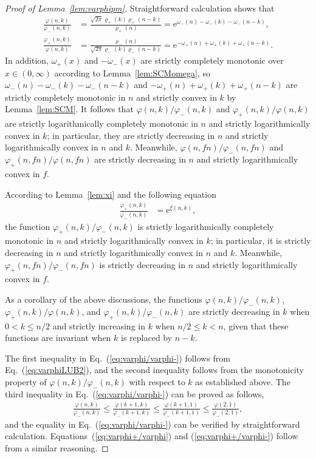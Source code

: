 \documentclass[aop]{imsart}
\theoremstyle{plain}
\theoremstyle{remark}
\newcommand{\rme}{\mathrm{e}}
\newcommand{\1}{\operatorname{\uppercase\expandafter{\romannumeral1}}}
\newcommand{\2}{\operatorname{\uppercase\expandafter{\romannumeral2}}}
\newcommand{\3}{\operatorname{\uppercase\expandafter{\romannumeral3}}}
\newcommand{\4}{\operatorname{\uppercase\expandafter{\romannumeral4}}}
\newcommand{\5}{\operatorname{\uppercase\expandafter{\romannumeral5}}}
\newcommand{\6}{\operatorname{\uppercase\expandafter{\romannumeral6}}}
\newcommand{\7}{\operatorname{\uppercase\expandafter{\romannumeral7}}}
\newcommand{\8}{\operatorname{\uppercase\expandafter{\romannumeral8}}}
\newcommand{\9}{\operatorname{\uppercase\expandafter{\romannumeral9}}}
\newcommand{\eref}[1]{Eq.~\textup{(\ref{#1})}}
\newcommand{\Eqsref}[2]{Equations~(\ref{#1}) and (\ref{#2})}
\newcommand{\lref}[1]{Lemma~\ref{#1}}
\begin{document}
\begin{proof}[Proof of \lref{lem:varphipm}]
Straightforward calculation shows that
	\begin{align}
	\frac{\varphi(n,k)}{\varphi_-(n,k)}&=\frac{\sqrt{2\pi}\varrho_+(k)\varrho_+(n-k)}{\varrho_+(n)}=\rme^{\omega_-(n)-\omega_-(k)-\omega_-(n-k)},\\
\frac{\varphi_+(n,k)}{\varphi(n,k)}&=\frac{\varrho_-(n)}{\sqrt{2\pi}\varrho_-(k)\varrho_-(n-k)}=\rme^{-\omega_+(n)+\omega_+(k)+\omega_+(n-k)}.
\end{align}
In addition, $\omega_+(x)$ and $-\omega_-(x)$ are strictly completely monotonic over $x\in (0,\infty)$ according to \lref{lem:SCMomega}, so $\omega_-(n)-\omega_-(k)-\omega_-(n-k)$ and $-\omega_+(n)+\omega_+(k)+\omega_+(n-k)$
are  strictly  completely monotonic in $n$ and strictly  convex in $k$ by  \lref{lem:SCM}. It follows that
 $\varphi(n,k)/\varphi_-(n,k)$ and
	$\varphi_+(n,k)/\varphi(n,k)$	are  strictly logarithmically completely monotonic in $n$ and strictly logarithmically convex in $k$; in particular, they are strictly decreasing in $n$ and strictly logarithmically convex in $n$ and $k$.  Meanwhile, $\varphi(n,fn)/\varphi_-(n,fn)$ and $\varphi_+(n,fn)/\varphi(n,fn)$
	are strictly decreasing in $n$ and strictly  logarithmically convex in  $f$.

 According to \lref{lem:xi} and the following equation 
	\begin{align}
	\frac{\varphi_+(n,k)}{\varphi_-(n,k)}&=\rme^{\xi(n,k)},
	\end{align}
	the function $\varphi_+(n,k)/\varphi_-(n,k)$	is
strictly logarithmically completely monotonic in $n$ and strictly logarithmically convex in $k$; in particular, it is strictly decreasing in $n$ and strictly logarithmically convex in $n$ and $k$. Meanwhile, $\varphi_+(n,fn)/\varphi_-(n,fn)$ is strictly decreasing in $n$ and strictly logarithmically convex in $f$. 

As a corollary of the above discussions, the functions $\varphi(n,k)/\varphi_-(n,k)$,
	$\varphi_+(n,k)/\varphi(n,k)$, and $\varphi_+(n,k)/\varphi_-(n,k)$ are strictly decreasing in  $k$ when $0<k\leq n/2$ and strictly increasing in $k$ when $n/2\leq k<n$, given that  these functions are invariant when $k$ is replaced by $n-k$. 
	
	The first inequality  in \eref{eq:varphi/varphi-} follows from \eref{eq:varphiLUB2}, and the second inequality  follows from the monotonicity property of $\varphi(n,k)/\varphi_-(n,k)$ with respect to $k$ as established above. The third inequality in \eref{eq:varphi/varphi-} can be proved as follows,
	\begin{gather}
	\frac{\varphi(n,k)}{\varphi_-(n,k)}\leq \frac{\varphi(k+1,k)}{\varphi_-(k+1,k)}\leq \frac{\varphi(k+1,1)}{\varphi_-(k+1,1)}\leq \frac{\varphi(2,1)}{\varphi_-(2,1)}, 
	\end{gather}
	and the equality in \eref{eq:varphi/varphi-} can be verified by straightforward calculation. \Eqsref{eq:varphi+/varphi}{eq:varphi+/varphi-} follow from a similar reasoning. 
\end{proof}
\end{document}
